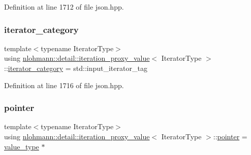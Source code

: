 Definition at line 1712 of file json.\+hpp.

\mbox{\label{classnlohmann_1_1detail_1_1iteration__proxy__value_a1ab8c44e3772c03651b5ad07216043cf}} 
\subsubsection{\texorpdfstring{iterator\_category}{iterator\_category}}
{\footnotesize\ttfamily template$<$typename Iterator\+Type$>$ \\
using \mbox{\hyperlink{classnlohmann_1_1detail_1_1iteration__proxy__value}{nlohmann\+::detail\+::iteration\+\_\+proxy\+\_\+value}}$<$ Iterator\+Type $>$\+::\mbox{\hyperlink{classnlohmann_1_1detail_1_1iteration__proxy__value_a1ab8c44e3772c03651b5ad07216043cf}{iterator\+\_\+category}} =  std\+::input\+\_\+iterator\+\_\+tag}



Definition at line 1716 of file json.\+hpp.

\mbox{\label{classnlohmann_1_1detail_1_1iteration__proxy__value_a44c64feee85b8e7164a05310e6418a4b}} 
\subsubsection{\texorpdfstring{pointer}{pointer}}
{\footnotesize\ttfamily template$<$typename Iterator\+Type$>$ \\
using \mbox{\hyperlink{classnlohmann_1_1detail_1_1iteration__proxy__value}{nlohmann\+::detail\+::iteration\+\_\+proxy\+\_\+value}}$<$ Iterator\+Type $>$\+::\mbox{\hyperlink{classnlohmann_1_1detail_1_1iteration__proxy__value_a44c64feee85b8e7164a05310e6418a4b}{pointer}} =  \mbox{\hyperlink{classnlohmann_1_1detail_1_1iteration__proxy__value_a5e90a5810cc1bb6c1000eabbfdfe7b9e}{value\+\_\+type}} $\ast$}



